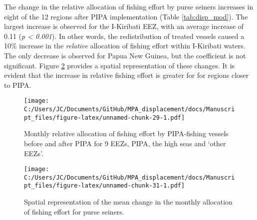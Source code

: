 \documentclass[12pt,]{article}
\begin{document}
The change in the relative allocation of fishing effort by purse seiners
increases in eight of the 12 regions after PIPA implementation (Table
\ref{tab:disp_mod}). The largest increase is observed for the I-Kiribati
EEZ, with an average increase of 0.11 (\emph{p \textless{} 0.001}). In
other words, the redistribution of treated vessels caused a 10\%
increase in the \emph{relative} allocation of fishing effort within
I-Kiribati waters. The only decrease is observed for Papua New Guinea,
but the coefficient is not significant. Figure \ref{fig:map_change_ps}
provides a spatial representation of these changes. It is evident that
the increase in relative fishing effort is greater for for regions
closer to PIPA.

\begin{figure}
\centering
\texttt{[image: C:/Users/JC/Documents/GitHub/MPA\_displacement/docs/Manuscript\_files/figure-latex/unnamed-chunk-29-1.pdf]}
\caption{\label{fig:unnamed-chunk-29}\label{fig:redist_trend_ps}Monthly
relative allocation of fishing effort by PIPA-fishing vessels before and
after PIPA for 9 EEZs, PIPA, the high seas and `other EEZs'.}
\end{figure}

\begin{figure}
\centering
\texttt{[image: C:/Users/JC/Documents/GitHub/MPA\_displacement/docs/Manuscript\_files/figure-latex/unnamed-chunk-31-1.pdf]}
\caption{\label{fig:unnamed-chunk-31}\label{fig:map_change_ps}Spatial
representation of the mean change in the monthly allocation of fishing
effort for purse seiners.}
\end{figure}
\end{document}
